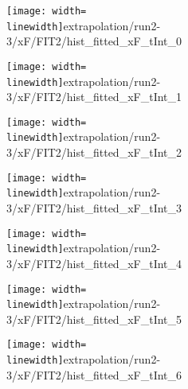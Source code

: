 \begin{figure}
\begin{subfigure}{0.45\linewidth}
\texttt{[image: width=\\linewidth]}{extrapolation/run2-3/xF/FIT2/hist_fitted_xF_tInt_0}
\end{subfigure}
\begin{subfigure}{0.45\linewidth}
\texttt{[image: width=\\linewidth]}{extrapolation/run2-3/xF/FIT2/hist_fitted_xF_tInt_1}
\end{subfigure}
\begin{subfigure}{0.45\linewidth}
\texttt{[image: width=\\linewidth]}{extrapolation/run2-3/xF/FIT2/hist_fitted_xF_tInt_2}
\end{subfigure}
\begin{subfigure}{0.45\linewidth}
\texttt{[image: width=\\linewidth]}{extrapolation/run2-3/xF/FIT2/hist_fitted_xF_tInt_3}
\end{subfigure}
\begin{subfigure}{0.45\linewidth}
\texttt{[image: width=\\linewidth]}{extrapolation/run2-3/xF/FIT2/hist_fitted_xF_tInt_4}
\end{subfigure}
\begin{subfigure}{0.45\linewidth}
\texttt{[image: width=\\linewidth]}{extrapolation/run2-3/xF/FIT2/hist_fitted_xF_tInt_5}
\end{subfigure}
\begin{subfigure}{0.45\linewidth}
\texttt{[image: width=\\linewidth]}{extrapolation/run2-3/xF/FIT2/hist_fitted_xF_tInt_6}
\end{subfigure}
\end{figure}
